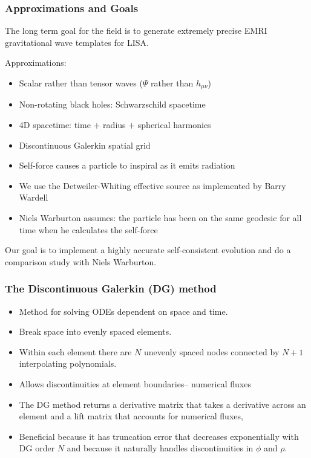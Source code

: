 \documentclass{beamer}
\begin{document}
\begin{frame}
  \frametitle{Approximations and Goals}
  The long term goal for the field is to generate extremely precise EMRI gravitational wave templates for LISA.

  Approximations:
  \begin{itemize}
  \item Scalar rather than tensor waves ($\Psi$ rather than $h_{\mu\nu}$)
  \item Non-rotating black holes: Schwarzschild spacetime
  \item 4D spacetime: time $+$ radius $+$ spherical harmonics
  \item Discontinuous Galerkin spatial grid
  \item Self-force causes a particle to inspiral as it emits radiation
  \item We use the Detweiler-Whiting effective source as implemented by Barry Wardell
  \item Niels Warburton assumes: the particle has been on the same geodesic for all time when he calculates the self-force
  \end{itemize}
  
  Our goal is to implement a highly accurate self-consistent evolution and do a comparison study with Niels Warburton.
  
\end{frame}


\begin{frame}
  \frametitle{The Discontinuous Galerkin (DG) method}
  \begin{itemize}
  \item Method for solving ODEs dependent on space and time.
  \item Break space into evenly spaced elements.
  \item Within each element there are $N$ unevenly spaced nodes connected by $N+1$ interpolating polynomials.
  \item Allows discontinuities at element boundaries-- numerical fluxes
  \item The DG method returns a derivative matrix that takes a derivative across an element and a lift matrix that accounts for numerical fluxes,
  \item Beneficial because it has truncation error that decreases exponentially with DG order $N$ and because it naturally handles discontinuities in $\phi$ and $\rho$. 
  \end{itemize}
\end{frame}
\end{document}
